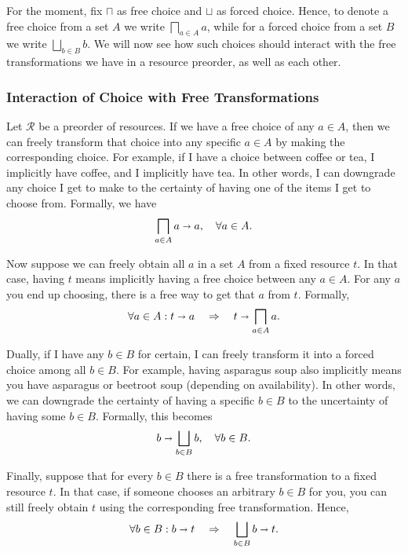 \documentclass[12pt]{article}
\theoremstyle{definition}
\theoremstyle{plain}
\theoremstyle{plain}
\theoremstyle{plain}
\theoremstyle{plain}
\theoremstyle{remark}
\theoremstyle{remark}
\newcommand{\mc}[1]{\mathcal{#1}}
\begin{document}
For the moment, fix $\sqcap$ as free choice and $\sqcup$ as forced choice. Hence, to  denote a free choice from a set $A$ we write $\bigsqcap_{a \in A} a$, while for a forced choice from a set $B$ we write $\bigsqcup_{b \in B} b$. We will now see how such choices should interact with the free transformations we have in a resource preorder, as well as each other.

\subsubsection{Interaction of Choice with Free Transformations}\label{sec:intr free}
Let $\mc{R}$ be a preorder of resources. If we have a free choice of any $a \in A$, then we can freely transform that choice into any specific $a \in A$ by making the corresponding choice. For example, if I have a choice between coffee or tea, I implicitly have coffee, and I implicitly have tea. In other words, I can downgrade any choice I get to make to the certainty of having one of the items I get to choose from. Formally, we have 
\begin{equation}\label{eq:meet 1}
	\bigsqcap_{a \in A} a \shortrightarrow a, \quad \forall a \in A.
\end{equation}

Now suppose we can freely obtain all $a$ in a set $A$ from a fixed resource $t$. In that case, having $t$ means implicitly having a free choice between any $a \in A$. For any $a$ you end up choosing, there is a free way to get that $a$ from $t$. Formally,
\begin{equation}\label{eq:meet 2}
	\forall a \in A : t \shortrightarrow a  \quad \Rightarrow \quad t \shortrightarrow 	\bigsqcap_{a \in A} a.
\end{equation}

Dually, if I have any $b \in B$ for certain, I can freely transform it into a forced choice among all $b \in B$. For example, having asparagus soup also implicitly means you have asparagus or beetroot soup (depending on availability). In other words, we can downgrade the certainty of having a specific $b \in B$ to the uncertainty of having some $b \in B$. Formally, this becomes
\begin{equation}\label{eq:join 1}
b \shortrightarrow \bigsqcup_{b \in B} b, \quad \forall b \in B.
\end{equation}

Finally, suppose that for every $b \in B$ there is a free transformation to a fixed resource $t$. In that case, if someone chooses an arbitrary $b \in B$ for you, you can still freely obtain $t$ using the corresponding free transformation. Hence,
\begin{equation}\label{eq:join 2}
\forall b \in B : b \shortrightarrow t  \quad \Rightarrow \quad  \bigsqcup_{b \in B} b \shortrightarrow t.
\end{equation}
\end{document}
